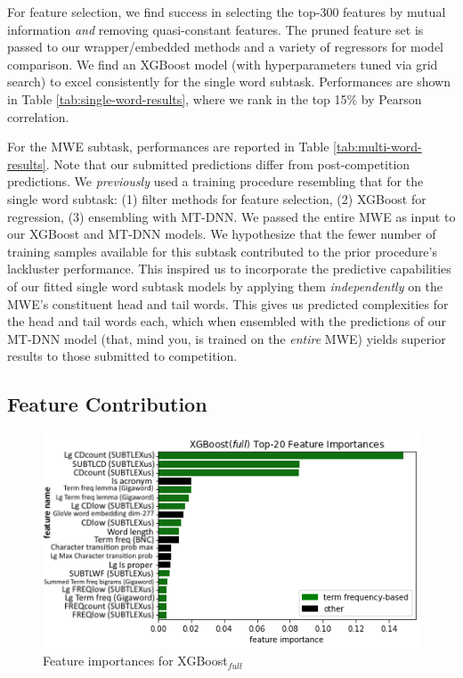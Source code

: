 \documentclass[11pt,a4paper]{article}
\begin{document}
\label{sec:performance}

For feature selection, we find success in selecting the top-300 features by mutual information \textit{and} removing quasi-constant features. The pruned feature set is passed to our wrapper/embedded methods and a variety of regressors for model comparison. We find an XGBoost model (with hyperparameters tuned via grid search) to excel consistently for the single word subtask. Performances are shown in Table \ref{tab:single-word-results}, where we rank in the top 15\% by Pearson correlation. 

For the MWE subtask, performances are reported in Table \ref{tab:multi-word-results}. Note that our submitted predictions differ from post-competition predictions. We \textit{previously} used a training procedure resembling that for the single word subtask: (1) filter methods for feature selection, (2) XGBoost for regression, (3) ensembling with MT-DNN. We passed the entire MWE as input to our XGBoost and MT-DNN models. We hypothesize that the fewer number of training samples available for this subtask contributed to the prior procedure's lackluster performance. This inspired us to incorporate the predictive capabilities of our fitted single word subtask models by applying them \textit{independently} on the MWE's constituent head and tail words. This gives us predicted complexities for the head and tail words each, which when ensembled with the predictions of our MT-DNN model (that, mind you, is trained on the \textit{entire} MWE) yields superior results to those submitted to competition.

\subsection{Feature Contribution}

\begin{figure}
  \centering
  \includegraphics[scale=0.45]{xgboost_feature_importances.png}
  \captionsetup{justification=centering}
  \caption{\label{fig:xgboost_feature_importance} Feature importances for XGBoost$_\textit{full}$}
\end{figure}
\end{document}
